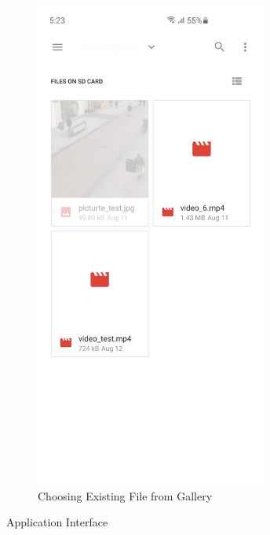 \begin{figure}[h!]
\begin{subfigure}{.5\textwidth}
        \includegraphics[width=3in]{images/appendix-b/sh-choosing.jpg}
        \caption{Choosing Existing File from Gallery}
        \label{appendix-b:filePicker}
        \end{subfigure}
        \caption{Application Interface}
        \label{appendix-b:menu}
    \end{figure}

